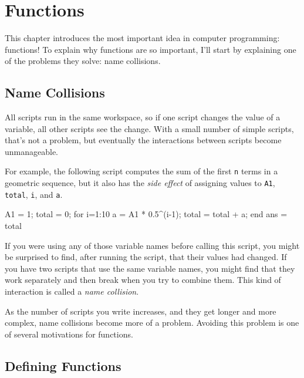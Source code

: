 \chapter{Functions}
\label{functions}


This chapter introduces the most important idea in computer programming: \mbox{functions}!
To explain why functions are so important, I'll start by explaining one of the problems they solve: name collisions.


\section{Name Collisions}
\label{collision}


All scripts run in the same workspace, so if one script changes the value of a variable, all other scripts see the change.  With a small number of simple scripts, that's not a problem, but eventually the interactions between scripts become unmanageable.

For example, the following script computes the
sum of the first \lstinline{n} terms in a geometric sequence, but it also
has the {\em side effect} of assigning values to \lstinline{A1}, \lstinline{total},
\lstinline{i}, and \lstinline{a}.

\begin{code}
A1 = 1;
total = 0;
for i=1:10
    a = A1 * 0.5^(i-1);
    total = total + a;
end
ans = total
\end{code}

If you were using any of those variable names before calling this
script, you might be surprised to find, after running the script,
that their values had changed.  If you have two scripts that use
the same variable names, you might find that they work separately
and then break when you try to combine them.  This kind of
interaction is called a \emph{name collision}.


As the number of scripts you write increases, and they get longer
and more complex, name collisions become more of a problem.  Avoiding
this problem is one of several motivations for functions.

\section{Defining Functions}

